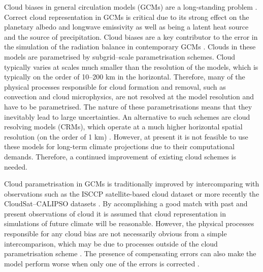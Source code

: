 Cloud biases in general circulation models (GCMs) are a long-standing problem
\citep{vignesh2020}. Correct cloud representation in GCMs is critical due
to its strong effect on the planetary albedo and longwave emissivity as well as
being a latent heat source and the source of precipitation. Cloud biases are a key contributor to the error in the
simulation of the radiation balance 
in contemporary GCMs \citep{li2013}. Clouds in these models are parametrised by subgrid--scale parametrisation schemes. Cloud typically varies at scales much smaller
than the resolution of the models, which is typically on the order of 10--200 km in the horizontal. Therefore, many of the physical
processes responsible for cloud formation and removal, such as convection and cloud microphysics, are not resolved at the
model resolution and have to be parametrised. The nature of these parametrisations means that they inevitably lead to large uncertainties. An alternative to such schemes are cloud resolving models
(CRMs), which operate at a much higher horizontal spatial resolution (on the order of 1 km)
\citep{guichard2017,satoh2019}.
However, at present it is not feasible to use these models for long-term climate
projections due to their computational demands. Therefore, a continued improvement of
existing cloud schemes is needed.

Cloud parametrisation in GCMs is traditionally improved by intercomparing with
observations such as the ISCCP satellite-based cloud dataset \citep{rossow1991}
or more recently the CloudSat--CALIPSO datasets
\citep{stephens2002,winker2003}. By accomplishing a good match with past and
present observations of cloud it is assumed that cloud representation in
simulations of future climate will be reasonable. However, the physical
processes responsible for any cloud bias are not necessarily obvious from a simple
intercomparison, which may be due to processes outside of the cloud
parametrisation scheme \citep{morcrette2010}. The presence of compensating
errors can also make the model perform worse when only one of the errors is
corrected \citep{hourdin2017,schuddeboom2019}.

